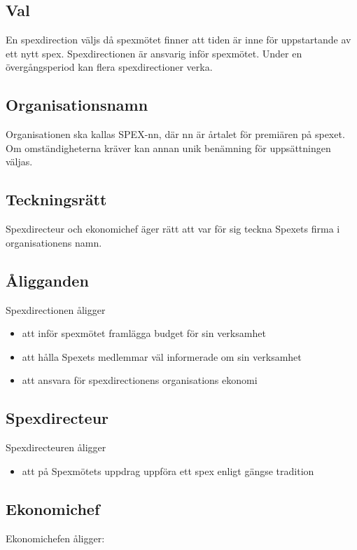 \documentclass[a4paper]{article}
\begin{document}
\subsection{Val}
En spexdirection väljs då spexmötet finner att tiden är inne för uppstartande av ett nytt spex. Spexdirectionen är ansvarig inför spexmötet. Under en övergångsperiod kan flera spexdirectioner verka.

\subsection{Organisationsnamn}
Organisationen ska kallas SPEX-nn, där nn är årtalet för premiären på spexet. Om omständigheterna kräver kan annan unik benämning för uppsättningen väljas.

\subsection{Teckningsrätt}
Spexdirecteur och ekonomichef äger rätt att var för sig teckna Spexets firma i organisationens namn.

\subsection{Åligganden}
Spexdirectionen åligger

\begin{itemize}
  \item att inför spexmötet framlägga budget för sin verksamhet
  \item att hålla Spexets medlemmar väl informerade om sin verksamhet
  \item att ansvara för spexdirectionens organisations ekonomi
\end{itemize}

\subsection{Spexdirecteur}
Spexdirecteuren åligger

\begin{itemize}
  \item att på Spexmötets uppdrag uppföra ett spex enligt gängse tradition
\end{itemize}

\subsection{Ekonomichef}
Ekonomichefen åligger:
\end{document}
